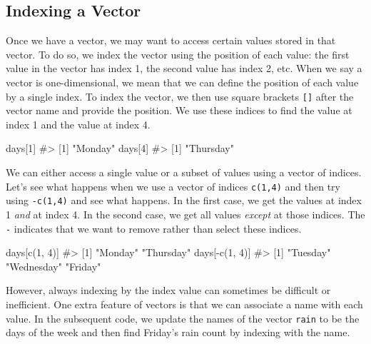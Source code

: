 \documentclass[
  letterpaper,
]{latex/krantz}
\makeatletter
\newenvironment{Shaded}{\begin{snugshade}}{\end{snugshade}}
\newcommand{\CommentTok}[1]{\textcolor[rgb]{0.37,0.37,0.37}{#1}}
\newcommand{\DecValTok}[1]{\textcolor[rgb]{0.68,0.00,0.00}{#1}}
\newcommand{\FunctionTok}[1]{\textcolor[rgb]{0.28,0.35,0.67}{#1}}
\newcommand{\NormalTok}[1]{\textcolor[rgb]{0.00,0.23,0.31}{#1}}
\newcommand{\SpecialCharTok}[1]{\textcolor[rgb]{0.37,0.37,0.37}{#1}}
\newenvironment{kframe}{%
\medskip{}
\setlength{\fboxsep}{.8em}
 \def\at@end@of@kframe{}%
 \ifinner\ifhmode%
  \def\at@end@of@kframe{\end{minipage}}%
  \begin{minipage}{\columnwidth}%
 \fi\fi%
 \def\FrameCommand##1{\hskip\@totalleftmargin \hskip-\fboxsep
 \colorbox{shadecolor}{##1}\hskip-\fboxsep
     \hskip-\linewidth \hskip-\@totalleftmargin \hskip\columnwidth}%
 \MakeFramed {\advance\hsize-\width
   \@totalleftmargin\z@ \linewidth\hsize
   \@setminipage}}%
 {\par\unskip\endMakeFramed%
 \at@end@of@kframe}
\renewenvironment{Shaded}{\begin{kframe}}{\end{kframe}}
\makeatother
\begin{document}
\subsection{\texorpdfstring{Indexing a Vector
}{Indexing a Vector }}\label{indexing-a-vector}

Once we have a vector, we may want to access certain values stored in
that vector. To do so, we index the vector using the position of each
value: the first value in the vector has index 1, the second value has
index 2, etc. When we say a vector is one-dimensional, we mean that we
can define the position of each value by a single index. To index the
vector, we then use square brackets \texttt{{[}{]}} after the vector
name and provide the position. We use these indices to find the value at
index 1 and the value at index 4.

\begin{Shaded}
\begin{Highlighting}[]
\NormalTok{days[}\DecValTok{1}\NormalTok{]}
\CommentTok{\#\textgreater{} [1] "Monday"}
\NormalTok{days[}\DecValTok{4}\NormalTok{]}
\CommentTok{\#\textgreater{} [1] "Thursday"}
\end{Highlighting}
\end{Shaded}

We can either access a single value or a subset of values using a vector
of indices. Let's see what happens when we use a vector of indices
\texttt{c(1,4)} and then try using \texttt{-c(1,4)} and see what
happens. In the first case, we get the values at index 1 \emph{and} at
index 4. In the second case, we get all values \emph{except} at those
indices. The \texttt{-} indicates that we want to remove rather than
select these indices.

\begin{Shaded}
\begin{Highlighting}[]
\NormalTok{days[}\FunctionTok{c}\NormalTok{(}\DecValTok{1}\NormalTok{, }\DecValTok{4}\NormalTok{)]}
\CommentTok{\#\textgreater{} [1] "Monday"   "Thursday"}
\NormalTok{days[}\SpecialCharTok{{-}}\FunctionTok{c}\NormalTok{(}\DecValTok{1}\NormalTok{, }\DecValTok{4}\NormalTok{)]}
\CommentTok{\#\textgreater{} [1] "Tuesday"   "Wednesday" "Friday"}
\end{Highlighting}
\end{Shaded}

However, always indexing by the index value can sometimes be difficult
or inefficient. One extra feature of vectors is that we can associate a
name with each value. In the subsequent code, we
update the names of the vector \texttt{rain} to be the days of the week
and then find Friday's rain count by indexing with the name.
\end{document}
